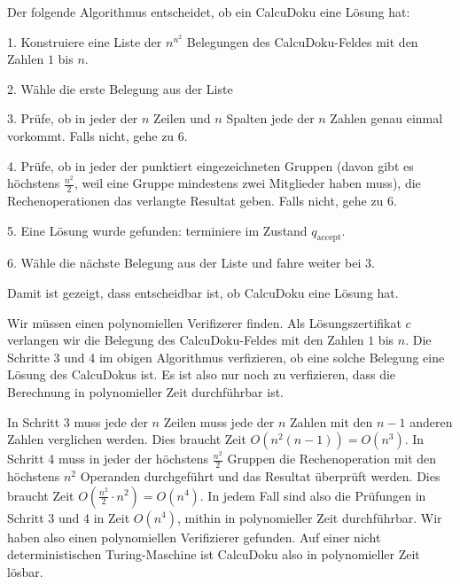 \begin{loesung}
\begin{teilaufgaben}
\item
Der folgende Algorithmus entscheidet, ob ein CalcuDoku eine Lösung
hat:
\begin{compactenum}
\item[1.] Konstruiere eine Liste der $n^{n^2}$ Belegungen des CalcuDoku-Feldes
mit den Zahlen $1$ bis $n$.
\item[2.] Wähle die erste Belegung aus der Liste
\item[3.] Prüfe, ob in jeder der $n$ Zeilen und $n$ Spalten jede der
$n$ Zahlen genau einmal vorkommt. Falls nicht, gehe zu 6.
\item[4.] Prüfe, ob in jeder der punktiert eingezeichneten Gruppen
(davon gibt es höchstens $\frac{n^2}2$, weil eine Gruppe mindestens
zwei Mitglieder haben muss), die Rechenoperationen das verlangte Resultat
geben. Falls nicht, gehe zu 6.
\item[5.]
Eine Lösung wurde gefunden: terminiere im Zustand $q_{\text{accept}}$.
\item[6.]
Wähle die nächste Belegung aus der Liste und fahre weiter bei 3.
\end{compactenum}
Damit ist gezeigt, dass entscheidbar ist, ob CalcuDoku eine Lösung
hat.
\item
Wir müssen einen polynomiellen Verifizerer finden. Als Lösungszertifikat
$c$ verlangen wir die Belegung des CalcuDoku-Feldes mit den Zahlen
$1$ bis $n$.
Die Schritte 3 und 4 im obigen Algorithmus verfizieren, ob eine solche
Belegung eine Lösung des CalcuDokus ist. Es ist also nur noch zu verfizieren,
dass die Berechnung in polynomieller Zeit durchführbar ist.

In Schritt 3 muss jede der $n$ Zeilen muss jede der $n$ Zahlen mit den
$n-1$ anderen Zahlen verglichen werden. Dies braucht Zeit $O(n^2(n-1))=O(n^3)$.
In Schritt 4 muss in jeder der höchstens $\frac{n^2}2$ Gruppen die 
Rechenoperation mit den höchstens $n^2$ Operanden durchgeführt und das
Resultat überprüft werden. Dies braucht Zeit $O(\frac{n^2}2\cdot n^2)=O(n^4)$.
In jedem Fall sind also die Prüfungen in Schritt 3 und 4 in Zeit $O(n^4)$,
mithin in polynomieller Zeit durchführbar. Wir haben also einen polynomiellen
Verifizierer gefunden.
Auf einer nicht deterministischen Turing-Maschine ist CalcuDoku also
in polynomieller Zeit lösbar.
\qedhere
\end{teilaufgaben}
\end{loesung}
